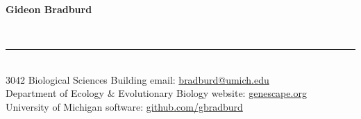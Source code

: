 \documentclass{gbcv}
\begin{document}
\thispagestyle{empty}
%
\begin{huge}
\bf{Gideon Bradburd}
\hfill\normalfont{\small{\textbf{\today}}}\
\end{huge}
\vspace{-0.25cm}
\\
%
\vspace{-0.7cm}
\rule{470pt}{0.4pt}
\vspace{0.3cm}
%
\\
3042 Biological Sciences Building \hfill email: \href{mailto:bradburd@umich.edu}{bradburd@umich.edu}\\
Department of Ecology \& Evolutionary Biology \hfill website: \href{http://genescape.org}{genescape.org}\\
University of Michigan \hfill software: \href{https://github.com/gbradburd}{github.com/gbradburd}\\

\end{document}
